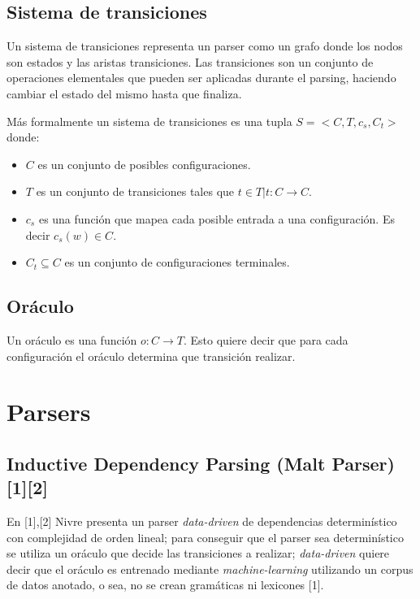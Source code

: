 \documentclass[11pt,a4paper,spanish]{article}
\begin{document}
\subsection{Sistema de transiciones}

Un sistema de transiciones representa un parser como un grafo donde los nodos son estados y las 
aristas transiciones. Las transiciones son un conjunto de operaciones elementales que pueden ser aplicadas durante el parsing, haciendo cambiar el estado del mismo hasta que finaliza. 

Más formalmente un sistema de transiciones es una tupla $S = <C,T,c_s,C_t>$ donde:
\begin{itemize}
\item $C$ es un conjunto de posibles configuraciones.
\item $T$ es un conjunto de transiciones tales que $t \in T | t: C\rightarrow C$.
\item $c_s$ es una función que mapea cada posible entrada a una configuración. Es decir $c_s(w)\in C$.
\item $C_t\subseteq C$ es un conjunto de configuraciones terminales. 
\end{itemize}

\subsection{Oráculo}

Un oráculo es una función $o: C\rightarrow T$. Esto quiere decir que para cada configuración el 
oráculo determina que transición realizar. 

\newpage
\section{Parsers}

\subsection{Inductive Dependency Parsing (Malt Parser) [1][2]} 

En [1],[2] Nivre presenta un parser \emph{data-driven} de dependencias determinístico con complejidad de orden lineal; para conseguir que el parser sea determinístico se utiliza un oráculo que decide las transiciones a realizar; \emph{data-driven} quiere decir que el oráculo es entrenado mediante 
\emph{machine-learning} utilizando un corpus de datos anotado, o sea, no se crean gramáticas ni lexicones [1]. 
\end{document}
